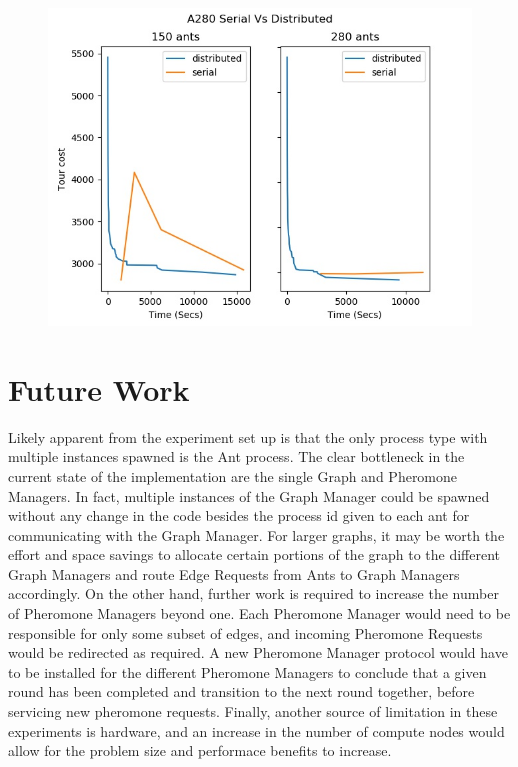 \documentclass[12pt]{article}
\begin{document}
\begin{figure}
    \includegraphics[scale=0.5]{a280_serial_vs_dist.jpg}
\end{figure}

\section{Future Work}
Likely apparent from the experiment set up is that the only process type with 
multiple instances spawned is the Ant process. The clear bottleneck in the 
current state of the implementation are the single Graph and Pheromone Managers. 
In fact, multiple instances of the Graph Manager could be spawned without any
change in the code besides the process id given to each ant for communicating with 
the Graph Manager. For larger graphs, it may be worth the effort and space savings 
to allocate certain portions of the graph to the different Graph Managers and route 
Edge Requests from Ants to Graph Managers accordingly. On the other hand, further work is required to increase the number 
of Pheromone Managers beyond one. Each Pheromone Manager would need to be responsible 
for only some subset of edges, and incoming Pheromone Requests would be redirected
as required. A new Pheromone Manager protocol would have to be installed for the 
different Pheromone Managers to conclude that a given round has been completed and 
transition to the next round together, before servicing new pheromone requests. Finally, 
another source of limitation in these experiments is hardware, and an increase 
in the number of compute nodes would allow for the problem size and performace benefits 
to increase.
\end{document}

